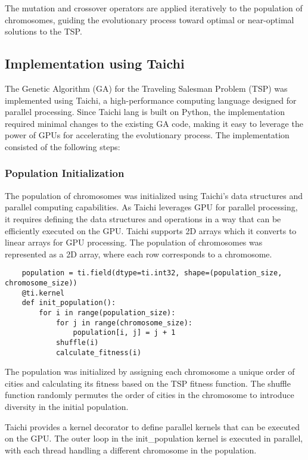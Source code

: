 \documentclass[conference]{IEEEtran}
\begin{document}
The mutation and crossover operators are applied iteratively to the population
of chromosomes, guiding the evolutionary process toward optimal or near-optimal
solutions to the TSP.

\subsection{Implementation using Taichi}
The Genetic Algorithm (GA) for the Traveling Salesman Problem (TSP) was
implemented using Taichi, a high-performance computing language designed for
parallel processing. Since Taichi lang is built on Python, the implementation
required minimal changes to the existing GA code, making it easy to leverage
the power of GPUs for accelerating the evolutionary process. The implementation
consisted of the following steps:

\subsubsection{Population Initialization}
The population of chromosomes was initialized using Taichi's data structures
and parallel computing capabilities. As Taichi leverages GPU for parallel
processing, it requires defining the data structures and operations in a way
that can be efficiently executed on the GPU. Taichi supports 2D arrays which it
converts to linear arrays for GPU processing. The population of chromosomes was
represented as a 2D array, where each row corresponds to a chromosome.

\begin{lstlisting}
    population = ti.field(dtype=ti.int32, shape=(population_size, chromosome_size))
    @ti.kernel
    def init_population():
        for i in range(population_size):
            for j in range(chromosome_size):
                population[i, j] = j + 1
            shuffle(i)
            calculate_fitness(i)
\end{lstlisting}

The population was initialized by assigning each chromosome a unique order of
cities and calculating its fitness based on the TSP fitness function. The
shuffle function randomly permutes the order of cities in the chromosome to
introduce diversity in the initial population.

Taichi provides a kernel decorator to define parallel kernels that can be
executed on the GPU. The outer loop in the init\_population kernel is executed
in parallel, with each thread handling a different chromosome in the population.
\end{document}
